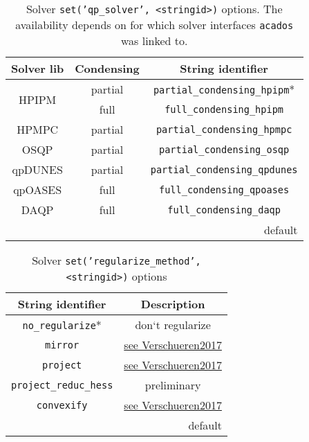 \documentclass[english]{article}
\newcommand{\code}[1]{\texttt{#1}}
\newcommand{\str}[1]{\texttt{'#1'}}
\newcommand{\acados}{\texttt{acados}}
\begin{document}
%
\begin{table}
    \centering
    \caption{Solver \code{set(\str{qp\_solver}, <stringid>)} options. The availability depends on for which solver interfaces \acados{} was linked to.}\label{tab:solver_options:qp_solver_option}
    \begin{tabular}{c@{ }c@{}c}
        \toprule
        Solver lib & Condensing & {String identifier} \\ \midrule
        \multirow{2}{1.2cm}{\centering HPIPM} & partial & \code{partial\_condensing\_hpipm}*\\
         & full & \code{full\_condensing\_hpipm} \\%
        HPMPC & partial & \code{partial\_condensing\_hpmpc} \\%
        OSQP & partial & \code{partial\_condensing\_osqp} \\
        qpDUNES & partial & \code{partial\_condensing\_qpdunes} \\
        qpOASES & full & \code{full\_condensing\_qpoases} \\
        DAQP & full & \code{full\_condensing\_daqp} \\
        \bottomrule
        \multicolumn{3}{r}{\footnotesize * default}
    \end{tabular}
\end{table}
%
\begin{table}
    \centering
    \caption{Solver \code{set(\str{regularize\_method}, <stringid>)} options}
    \label{tab:solver_options:regularize_method}
    \begin{tabular}{cc}
        \toprule
        String identifier & Description \\\midrule
        \code{no\_regularize}* & don‘t regularize \\
        \code{mirror} & \href{https://cdn.syscop.de/publications/Verschueren2017.pdf}{see Verschueren2017} \\
        \code{project} & \href{https://cdn.syscop.de/publications/Verschueren2017.pdf}{see Verschueren2017} \\
        \code{project\_reduc\_hess} & preliminary \\
        \code{convexify} & \href{https://cdn.syscop.de/publications/Verschueren2017.pdf}{see Verschueren2017} \\
        \bottomrule
        \multicolumn{2}{r}{\footnotesize * default}
    \end{tabular}
\end{table}
\end{document}
